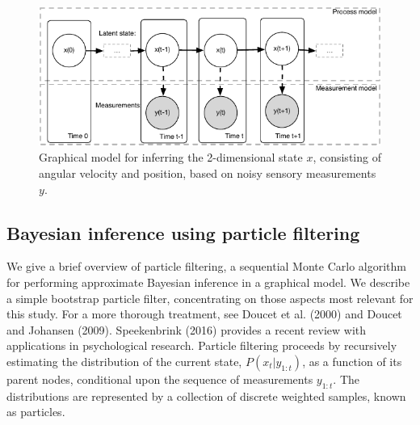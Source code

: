 \documentclass[english,floatsintext,man]{apa6}
\theoremstyle{definition}
\theoremstyle{definition}
\theoremstyle{remark}
\begin{document}
\begin{figure}
\centering
\includegraphics{diagrams/dynamic-belief-network-inference-1.pdf}
\caption{\label{fig:graphical-model-inference}Graphical model for inferring
the 2-dimensional state \(x\), consisting of angular velocity and
position, based on noisy sensory measurements \(y\).}
\end{figure}

\subsection{Bayesian inference using particle
filtering}\label{bayesian-inference-using-particle-filtering}

We give a brief overview of particle filtering, a sequential Monte Carlo
algorithm for performing approximate Bayesian inference in a graphical
model. We describe a simple bootstrap particle filter, concentrating on
those aspects most relevant for this study. For a more thorough
treatment, see Doucet et al. (2000) and Doucet and Johansen (2009).
Speekenbrink (2016) provides a recent review with applications in
psychological research. Particle filtering proceeds by recursively
estimating the distribution of the current state, \(P(x_t | y_{1:t})\),
as a function of its parent nodes, conditional upon the sequence of
measurements \(y_{1:t}\). The distributions are represented by a
collection of discrete weighted samples, known as particles.
\end{document}
